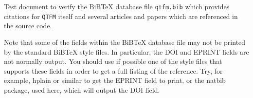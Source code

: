 \documentclass{article}
\begin{document}
Test document to verify the BiBTeX database file \texttt{qtfm.bib}
which provides citations for \texttt{QTFM} itself and several articles
and papers which are referenced in the source code.

Note that some of the fields within the BiBTeX database file may not be
printed by the standard BiBTeX style files. In particular, the DOI and
EPRINT fields are not normally output. You should use if possible one of
the style files that supports these fields in order to get a full listing
of the reference. Try, for example, hplain or similar to get the EPRINT
field to print, or the natbib package, used here, which will output the
DOI field.
\nocite{*}


\end{document}

